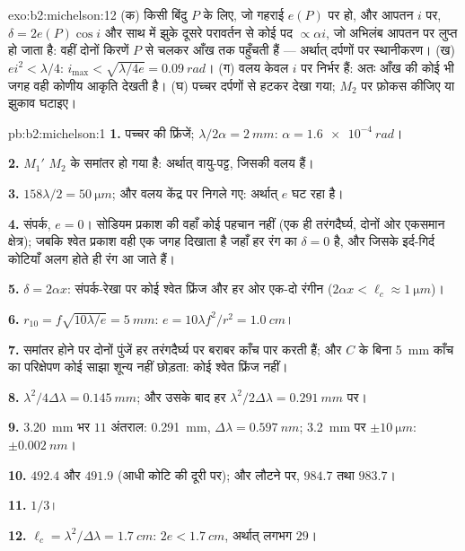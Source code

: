 \begin{solution}{exo:b2:michelson:12}
(क) किसी बिंदु $P$ के लिए, जो गहराई $e(P)$ पर हो, और आपतन $i$ पर, $\delta = 2e(P)\cos i$
और साथ में झुके दूसरे परावर्तन से कोई पद $\propto\alpha i$, जो
अभिलंब आपतन पर लुप्त हो जाता है: वहीं दोनों किरणें $P$ से चलकर
आँख तक पहुँचती हैं --- अर्थात् दर्पणों पर स्थानीकरण। (ख) $ei^2 < \lambda/4$: $i_{\max} <
\sqrt{\lambda/4e} = \qty{0.09}{rad}$। (ग) वलय केवल $i$ पर निर्भर हैं: अतः आँख की कोई भी
जगह वही कोणीय आकृति देखती है। (घ) पच्चर दर्पणों से हटकर देखा गया;
$M_2$ पर फ़ोकस कीजिए या झुकाव घटाइए।
\end{solution}

\begin{solution}{pb:b2:michelson:1}
\textbf{1.} पच्चर की फ्रिंजें; $\lambda/2\alpha = \qty{2}{mm}$: $\alpha = \qty{1.6e-4}{rad}$।

\textbf{2.} $M_1'$ $M_2$ के समांतर हो गया है: अर्थात् वायु-पट्ट, जिसकी
 वलय हैं।

\textbf{3.} $158\lambda/2 = \qty{50}{\micro m}$; और वलय केंद्र पर निगले गए: अर्थात् $e$
घट रहा है।

\textbf{4.} संपर्क, $e = 0$। सोडियम प्रकाश की वहाँ कोई पहचान नहीं (एक ही
तरंगदैर्घ्य, दोनों ओर एकसमान क्षेत्र); जबकि श्वेत प्रकाश वही एक
जगह दिखाता है जहाँ हर रंग का $\delta = 0$ है, और जिसके इर्द-गिर्द कोटियाँ अलग
होते ही रंग आ जाते हैं।

\textbf{5.} $\delta = 2\alpha x$: संपर्क-रेखा पर कोई श्वेत फ्रिंज और हर ओर एक-दो
रंगीन ($2\alpha x < \ell_c \approx \qty{1}{\micro m}$)।

\textbf{6.} $r_{10} = f\sqrt{10\lambda/e} = \qty{5}{mm}$: $e = 10\lambda f^2/r^2 = \qty{1.0}{cm}$।

\textbf{7.} समांतर होने पर दोनों पुंजें हर तरंगदैर्घ्य पर बराबर काँच पार
करती हैं; और $C$ के बिना \qty{5}{mm} काँच का परिक्षेपण कोई
साझा शून्य नहीं छोड़ता: कोई श्वेत फ्रिंज नहीं।

\textbf{8.} $\lambda^2/4\Delta\lambda = \qty{0.145}{mm}$; और उसके बाद हर $\lambda^2/2\Delta\lambda = \qty{0.291}{mm}$ पर।

\textbf{9.} \qty{3.20}{mm} भर $11$ अंतराल: \qty{0.291}{mm}, $\Delta\lambda = \qty{0.597}{nm}$;
\qty{3.2}{mm} पर $\pm\qty{10}{\micro m}$: $\pm\qty{0.002}{nm}$।

\textbf{10.} $492.4$ और $491.9$ (आधी कोटि की दूरी पर); और लौटने पर,
$984.7$ तथा $983.7$।

\textbf{11.} $1/3$।

\textbf{12.} $\ell_c = \lambda^2/\Delta\lambda = \qty{1.7}{cm}$: $2e < \qty{1.7}{cm}$, अर्थात् लगभग $29$।


\end{solution}
